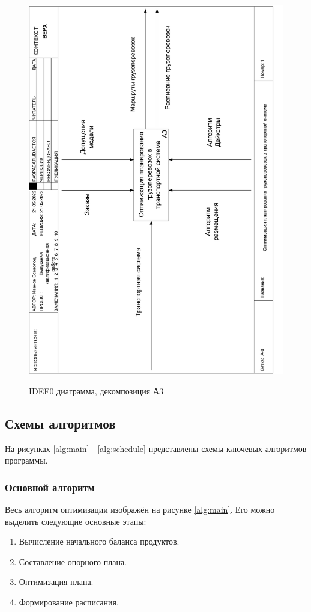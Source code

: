 \pagebreak
\begin{figure}[h]
	\begin{center}
		{\includegraphics[scale=0.63, angle=-90, page=6]{img/idef0.pdf}}
		\caption{IDEF0 диаграмма, декомпозиция А3}
		\label{idef0:A3}
	\end{center}
\end{figure}

\subsection{Схемы алгоритмов}
На рисунках \ref{alg:main} - \ref{alg:schedule} представлены схемы ключевых алгоритмов программы.

\subsubsection{Основной алгоритм}
Весь алгоритм оптимизации изображён на рисунке \ref{alg:main}. Его можно выделить следующие основные этапы:
\begin{enumerate}
	\item Вычисление начального баланса продуктов.
	\item Составление опорного плана.
	\item Оптимизация плана.
	\item Формирование расписания.
\end{enumerate}

